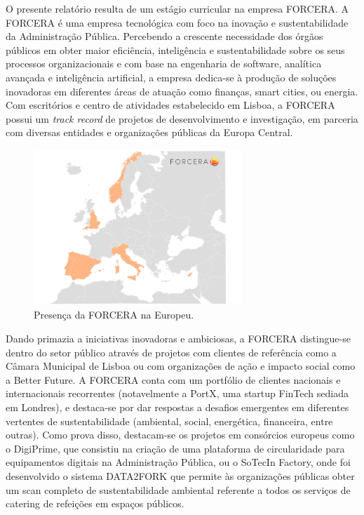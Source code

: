 O presente relatório resulta de um estágio curricular na empresa FORCERA. A FORCERA é uma empresa tecnológica com foco na inovação e sustentabilidade da Administração Pública. Percebendo a crescente necessidade dos órgãos públicos em obter maior eficiência, inteligência e sustentabilidade sobre os seus processos organizacionais e com base na engenharia de software, analítica avançada e inteligência artificial, a empresa dedica-se à produção de soluções inovadoras em diferentes áreas de atuação como finanças, smart cities, ou energia. 
Com escritórios e centro de atividades estabelecido em Lisboa, a FORCERA possui um \textit{track record} de projetos de desenvolvimento e investigação, em parceria com diversas entidades e organizações públicas da Europa Central.

\begin{figure}[H]
	\centering
	\includegraphics[width=0.7\textwidth]{imagens/forcera.png}
	\caption{Presença da FORCERA na Europeu.}
	\label{fig:forcera}
\end{figure}


Dando primazia a iniciativas inovadoras e ambiciosas, a FORCERA distingue-se dentro do setor público através de projetos com clientes de referência como a Câmara Municipal de Lisboa ou com organizações de ação e impacto social como a Better Future. A FORCERA conta com um portfólio de clientes nacionais e internacionais recorrentes (notavelmente a PortX, uma startup FinTech sediada em Londres), e destaca-se por dar respostas a desafios emergentes em diferentes vertentes de sustentabilidade (ambiental, social, energética, financeira, entre outras). Como prova disso, destacam-se os projetos em consórcios europeus como o DigiPrime, que consistiu na criação de uma plataforma de circularidade para equipamentos digitais na Administração Pública, ou o SoTecIn Factory, onde foi desenvolvido o sistema DATA2FORK que permite às organizações públicas obter um scan completo de sustentabilidade ambiental referente a todos os serviços de catering de refeições em espaços públicos.

